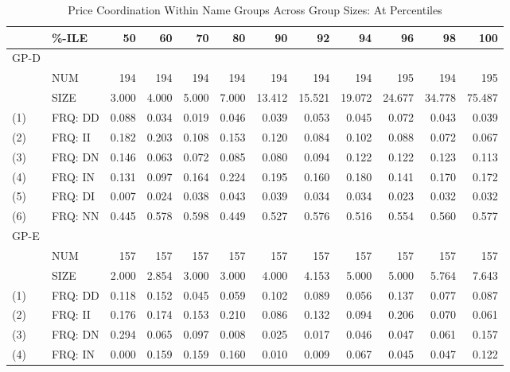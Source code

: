 \begin{table}[H]
	\caption{Price Coordination Within Name Groups Across Group Sizes: At Percentiles}\label{tbl2}
	\begin{tabular}{llrrrrrrrrrr}
		\hline\hline
		& \%-ILE  &    50 &    60 &    70 &    80 &     90 &     92 &     94 &     96 &     98 &    100 \\ \hline\hline
		GP-D &         &       &       &       &       &        &        &        &        &        &        \\
		& NUM     &   194 &   194 &   194 &   194 &    194 &    194 &    194 &    195 &    194 &    195 \\
		& SIZE    & 3.000 & 4.000 & 5.000 & 7.000 & 13.412 & 15.521 & 19.072 & 24.677 & 34.778 & 75.487 \\
		(1)  & FRQ: DD & 0.088 & 0.034 & 0.019 & 0.046 &  0.039 &  0.053 &  0.045 &  0.072 &  0.043 &  0.039 \\
		(2)  & FRQ: II & 0.182 & 0.203 & 0.108 & 0.153 &  0.120 &  0.084 &  0.102 &  0.088 &  0.072 &  0.067 \\
		(3)  & FRQ: DN & 0.146 & 0.063 & 0.072 & 0.085 &  0.080 &  0.094 &  0.122 &  0.122 &  0.123 &  0.113 \\
		(4)  & FRQ: IN & 0.131 & 0.097 & 0.164 & 0.224 &  0.195 &  0.160 &  0.180 &  0.141 &  0.170 &  0.172 \\
		(5)  & FRQ: DI & 0.007 & 0.024 & 0.038 & 0.043 &  0.039 &  0.034 &  0.034 &  0.023 &  0.032 &  0.032 \\
		(6)  & FRQ: NN & 0.445 & 0.578 & 0.598 & 0.449 &  0.527 &  0.576 &  0.516 &  0.554 &  0.560 &  0.577 \\ \hline
		GP-E &         &       &       &       &       &        &        &        &        &        &        \\
		& NUM     &   157 &   157 &   157 &   157 &    157 &    157 &    157 &    157 &    157 &    157 \\
		& SIZE    & 2.000 & 2.854 & 3.000 & 3.000 &  4.000 &  4.153 &  5.000 &  5.000 &  5.764 &  7.643 \\
		(1)  & FRQ: DD & 0.118 & 0.152 & 0.045 & 0.059 &  0.102 &  0.089 &  0.056 &  0.137 &  0.077 &  0.087 \\
		(2)  & FRQ: II & 0.176 & 0.174 & 0.153 & 0.210 &  0.086 &  0.132 &  0.094 &  0.206 &  0.070 &  0.061 \\
		(3)  & FRQ: DN & 0.294 & 0.065 & 0.097 & 0.008 &  0.025 &  0.017 &  0.046 &  0.047 &  0.061 &  0.157 \\
		(4)  & FRQ: IN & 0.000 & 0.159 & 0.159 & 0.160 &  0.010 &  0.009 &  0.067 &  0.045 &  0.047 &  0.122 \\

\end{tabular}
\end{table}

